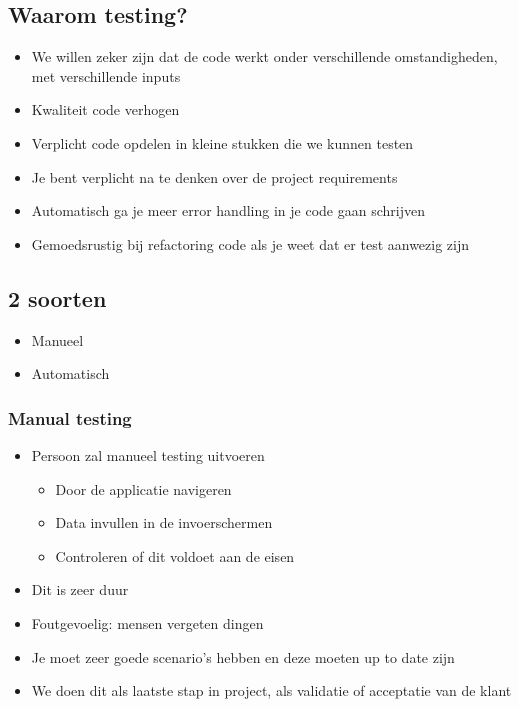 \documentclass{article}
\begin{document}
\subsection{Waarom testing?}

\begin{itemize}
    \item We willen zeker zijn dat de code werkt onder verschillende omstandigheden, met verschillende inputs
    \item Kwaliteit code verhogen
    \item Verplicht code opdelen in kleine stukken die we kunnen testen
    \item Je bent verplicht na te denken over de project requirements
    \item Automatisch ga je meer error handling in je code gaan schrijven
    \item Gemoedsrustig bij refactoring code als je weet dat er test aanwezig zijn
\end{itemize}

\subsection{2 soorten}

\begin{itemize}
    \item Manueel
    \item Automatisch
\end{itemize}

\subsubsection{Manual testing}

\begin{itemize}
    \item Persoon zal manueel testing uitvoeren
    \begin{itemize}
        \item Door de applicatie navigeren
        \item Data invullen in de invoerschermen
        \item Controleren of dit voldoet aan de eisen
    \end{itemize}
    \item Dit is zeer duur
    \item Foutgevoelig: mensen vergeten dingen
    \item Je moet zeer goede scenario's hebben en deze moeten up to date zijn
    \item We doen dit als laatste stap in project, als validatie of acceptatie van de klant
\end{itemize}
\end{document}
